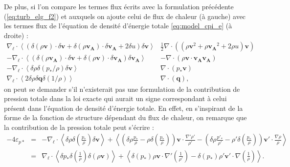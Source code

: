 De plus, si l'on compare les termes flux écrits avec la formulation précédente (\eqref{eq:turb_elg_f2}) et auxquels on ajoute celui de flux de chaleur (à gauche) avec les termes flux de l'équation de densité d'énergie totale \eqref{eq:model_cpi_e} (à droite) : 
\begin{equation*}
\begin{array}{r|l}
  \nabla_{\boldsymbol{\ell}} \cdot \left<\left(\delta \left(\rho\boldsymbol{v}\right) \cdot \delta \boldsymbol{v}+ \delta \left(\rho\boldsymbol{v_A}\right) \cdot \delta \boldsymbol{v_A} + 2\delta u\right) \delta \boldsymbol{v} \right> & \frac{1}{2}\nabla \cdot \left(\left(\rho \boldsymbol{v}^2 + \rho \boldsymbol{v_A}^2 + 2\rho u\right) \boldsymbol{v} \right)\\
   - \nabla_{\boldsymbol{\ell}} \cdot \left<\left(\delta \left(\rho\boldsymbol{v_A}\right) \cdot \delta \boldsymbol{v}  + \delta \left(\rho\boldsymbol{v}\right) \cdot \delta \boldsymbol{v_A}  \right) \delta \boldsymbol{v_A}  \right> & - \nabla \cdot \left(\rho \boldsymbol{v} \cdot \boldsymbol{v_A}\boldsymbol{v_A}\right)\\
   -  \nabla_{\boldsymbol{\ell}} \cdot \left<\delta \rho \delta \left(p_*/\rho\right)\delta \boldsymbol{v}\right> & \nabla \cdot \left(p_* \boldsymbol{v}\right)\\
   \nabla_{\boldsymbol{\ell}} \cdot \left<2\delta \rho \delta \boldsymbol{q}\delta \left(1/\rho\right) \right> & \nabla \cdot \left(\boldsymbol{q}\right),
   \end{array}
\end{equation*}
on peut se demander s'il n'existerait pas une formulation de la contribution de pression totale dans la loi exacte qui aurait un signe correspondant à celui présent dans l'équation de densité d'énergie totale. En effet, en s'inspirant de la forme de la fonction de structure dépendant du flux de chaleur, on remarque que la contribution de la pression totale peut s'écrire : 
\begin{eqnarray*}
 \label{eq:turb_ref_ptot} -4\varepsilon_{p*}  &=&- \nabla_{\boldsymbol{\ell}} \cdot \left<\delta \rho  \delta \left(\frac{p_*}{\rho}\right) \delta \boldsymbol{v} \right> + \left<\left(\delta \rho \frac{p_*}{\rho} - \rho \delta \left(\frac{p_*}{\rho}\right)\right)\boldsymbol{v} \cdot \frac{\nabla' \rho'}{\rho'} - \left(\delta \rho \frac{p'_*}{\rho'} - \rho' \delta \left(\frac{p_*}{\rho}\right)\right)\boldsymbol{v'} \cdot \frac{\nabla \rho}{\rho}\right>\\
    &=&\nabla_{\boldsymbol{\ell}} \cdot \left<\delta p_*  \delta \left(\frac{1}{\rho}\right) \delta\left(\rho \boldsymbol{v}\right) \right> + \left< \delta \left(p_*\right) \rho \boldsymbol{v} \cdot \nabla'\left(\frac{1}{\rho'}\right) - \delta \left(p_*\right) \rho' \boldsymbol{v'} \cdot \nabla \left(\frac{1}{\rho}\right)\right> .
\end{eqnarray*}
